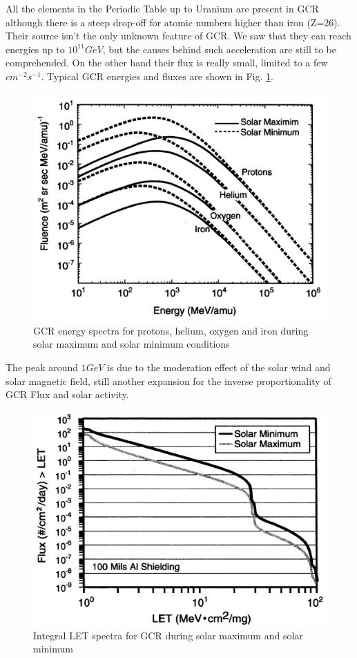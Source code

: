 \documentclass[./dissertation.tex]{subfiles}
\begin{document}
All the elements in the Periodic Table up to Uranium are present in GCR although there is a steep drop-off for atomic numbers higher than iron (Z=26). Their source isn't the only unknown feature of GCR. We saw that they can reach energies up to $10^{11}GeV$, but the causes behind such acceleration are still to be comprehended. On the other hand their flux is really small, limited to a few $cm^{-2}s^{-1}$. Typical GCR energies and fluxes are shown in Fig. \ref{fig:enflux}.


\begin{figure}[!ht]
   \centering
    \includegraphics[scale=.5]{imgs/GCR_energy_p.png}
   \caption{GCR energy spectra for protons, helium, oxygen and iron during solar maximum and solar minimum conditions}
   \label{fig:enflux}
\end{figure}
The peak around $1GeV$ is due to the moderation effect of the solar wind and solar magnetic field, still another expansion for the inverse proportionality of GCR Flux and solar activity.
\begin{figure}[!h]
   \centering
    \includegraphics[scale=.5]{imgs/LET_sun.png}
   \caption{Integral LET spectra  for GCR during  solar  maximum  and solar minimum}
   \label{fig:sub1}
\end{figure}
\end{document}
